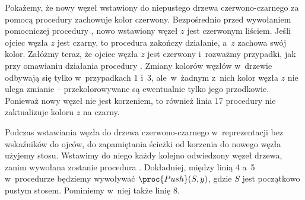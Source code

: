 \exercise %
Pokażemy, że nowy węzeł wstawiony do niepustego drzewa czerwono-czarnego za pomocą procedury  zachowuje kolor czerwony.
Bezpośrednio przed wywołaniem pomocniczej procedury , nowo wstawiony węzeł $z$ jest czerwonym liściem.
Jeśli ojciec węzła $z$ jest czarny, to procedura zakończy działanie, a~$z$ zachowa swój kolor.
Załóżmy teraz, że ojciec węzła $z$ jest czerwony i~rozważmy przypadki, jak przy omawianiu działania procedury .
Zmiany kolorów węzłów w~drzewie odbywają się tylko w~przypadkach 1 i~3, ale~w~żadnym z~nich kolor węzła $z$ nie ulega zmianie -- przekolorowywane są ewentualnie tylko jego przodkowie.
Ponieważ nowy węzeł nie jest korzeniem, to również linia 17 procedury  nie zaktualizuje koloru $z$ na czarny.

\exercise %
Podczas wstawiania węzła do drzewa czerwono-czarnego w~reprezentacji bez wskaźników do ojców, do zapamiętania ścieżki od korzenia do nowego węzła użyjemy stosu.
Wstawimy do niego każdy kolejno odwiedzony węzeł drzewa, zanim wywołana zostanie procedura .
Dokładniej, między linią 4 a~5 w~procedurze  będziemy wywoływać $\proc{Push}(S,y)$, gdzie $S$ jest początkowo pustym stosem.
Pominiemy w~niej także linię 8.

